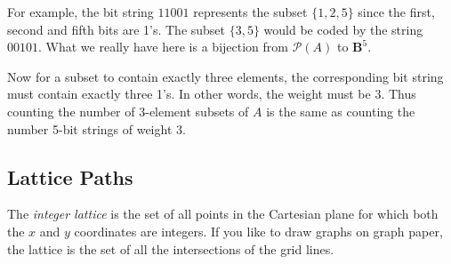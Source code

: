 \documentclass[10pt,]{book}
\theoremstyle{plain}
\theoremstyle{definition}
\theoremstyle{definition}
\theoremstyle{definition}
\numberwithin{equation}{chapter}
\def\B{\mathbf{B}}
\def\pow{\mathcal P}
\begin{document}
        For example, the bit string \(11001\) represents the subset \(\{1,2,5\}\) since the first, second and fifth bits are 1's. The subset \(\{3,5\}\) would be coded by the string \(00101\). What we really have here is a bijection from \(\pow(A)\) to \(\B^5\).
\par

        Now for a subset to contain exactly three elements, the corresponding bit string must contain exactly three 1's. In other words, the weight must be 3. Thus counting the number of 3-element subsets of \(A\) is the same as counting the number 5-bit strings of weight 3.
\typeout{************************************************}
\typeout{************************************************}
\subsection[ Lattice Paths]{ Lattice Paths}\label{subsection-14}

        The \emph{integer lattice} is the set of all points in the Cartesian plane for which both the \(x\) and \(y\) coordinates are integers. If you like to draw graphs on graph paper, the lattice is the set of all the intersections of the grid lines.
\par
\end{document}
